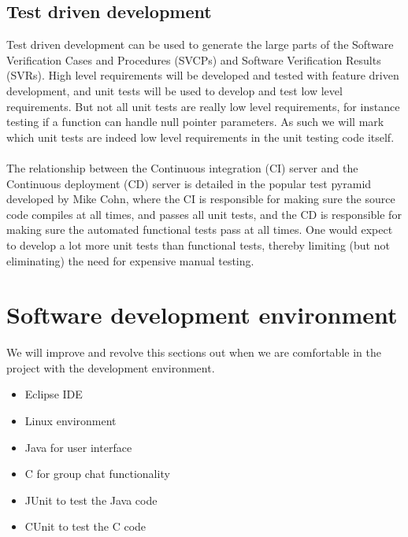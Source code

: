 \documentclass[a4paper]{article}
\begin{document}
\subsection{Test driven development}
Test driven development can be used to generate the large parts of the Software Verification Cases and Procedures (SVCPs) and Software Verification Results (SVRs). High level requirements will be developed and tested with feature driven development, and unit tests will be used to develop and test low level requirements. But not all unit tests are really low level requirements, for instance testing if a function can handle null pointer parameters. As such we will mark which unit tests are indeed low level requirements in the unit testing code itself.\\ 
\\
The relationship between the Continuous integration (CI) server and the Continuous deployment (CD) server is detailed in the popular test pyramid developed by Mike Cohn, where the CI is responsible for making sure the source code compiles at all times, and passes all unit tests, and the CD is responsible for making sure the automated functional tests pass at all times. One would expect to develop a lot more unit tests than functional tests, thereby limiting (but not eliminating) the need for expensive manual testing.\\
\newpage


\section{Software development environment}

We will improve and revolve this sections out when we are comfortable in the project with the development environment.

\begin{itemize}
	\item Eclipse IDE
	\item Linux environment
	\item Java for user interface
	\item C for group chat functionality
	\item JUnit to test the Java code
	\item CUnit to test the C code
\end{itemize}

\end{document}

